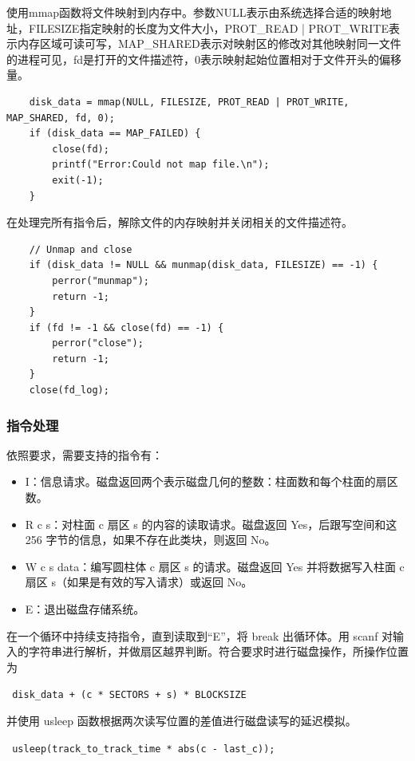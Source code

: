 \documentclass{article}
\begin{document}
使用mmap函数将文件映射到内存中。参数NULL表示由系统选择合适的映射地址，FILESIZE指定映射的长度为文件大小，PROT\_READ | PROT\_WRITE表示内存区域可读可写，MAP\_SHARED表示对映射区的修改对其他映射同一文件的进程可见，fd是打开的文件描述符，0表示映射起始位置相对于文件开头的偏移量。

\begin{lstlisting}
	disk_data = mmap(NULL, FILESIZE, PROT_READ | PROT_WRITE, MAP_SHARED, fd, 0);
	if (disk_data == MAP_FAILED) {
        close(fd);
        printf("Error:Could not map file.\n");
        exit(-1);
    }
\end{lstlisting}

在处理完所有指令后，解除文件的内存映射并关闭相关的文件描述符。

\begin{lstlisting}
	// Unmap and close
    if (disk_data != NULL && munmap(disk_data, FILESIZE) == -1) {
        perror("munmap");
        return -1;
    }
    if (fd != -1 && close(fd) == -1) {
        perror("close");
        return -1;
    }
    close(fd_log);
\end{lstlisting}

\subsubsection{指令处理}

依照要求，需要支持的指令有：

\begin{itemize}
	\item I：信息请求。磁盘返回两个表示磁盘几何的整数：柱面数和每个柱面的扇区数。
	\item R c s：对柱面 c 扇区 s 的内容的读取请求。磁盘返回 Yes，后跟写空间和这 256 字节的信息，如果不存在此类块，则返回 No。
	\item W c s data：编写圆柱体 c 扇区 s 的请求。磁盘返回 Yes 并将数据写入柱面 c 扇区 s（如果是有效的写入请求）或返回 No。
	\item E：退出磁盘存储系统。
\end{itemize}

在一个循环中持续支持指令，直到读取到“E”，将 break 出循环体。用 scanf 对输入的字符串进行解析，并做扇区越界判断。符合要求时进行磁盘操作，所操作位置为

 \verb| disk_data + (c * SECTORS + s) * BLOCKSIZE|
 
 并使用 usleep 函数根据两次读写位置的差值进行磁盘读写的延迟模拟。
 
  \verb| usleep(track_to_track_time * abs(c - last_c));|
\end{document}
